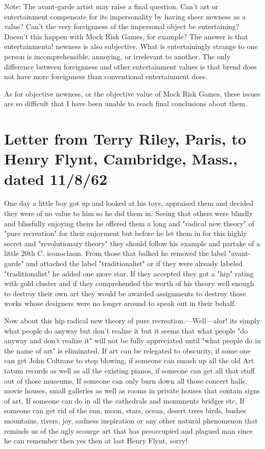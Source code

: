 \documentclass[10pt,twoside]{memoir}
\begin{document}
\begin{enumerate}
{\begin{enumerate}
Note: The avant-garde artist may raise a final question. Can't art or 
entertainment compensate for its impersonality by having sheer newness as a 
value? Can't the very foreignness of the impersonal object be entertaining? 
Doesn't this happen with Mock Risk Games, for example? The answer is 
that entertainmenta! newness is also subjective. What is entertainingly 
strange to one person is incomprehensible, annoying, or irrelevant to 
another. The only difference between foreignness and other entertainment 
values is that brend does not have more foreignness than conventional 
entertainment does. 

As for objective newness, or the objective value of Mock Risk Games, these 
issues are so difficult that I have been unable to reach final conclusions 
about them. 

\clearpage

\section{Letter from Terry Riley, Paris, to Henry Flynt, Cambridge, 
Mass., dated 11/8/62}

One day a little boy got up and looked at his toys, appraised them and 
decided they were of no value to him so he did them in. Seeing that others 
were blindly and blissfully enjoying theirs he offered them a long and 
"radical new theory" of "pure recreation" for their enjoyment but before he 
let them in for this highly secret and "revolutionary theory" they should 
follow his example and partake of a little 20th C. iconoclasm. From those 
that balked he removed the label "avant-garde" and attached the label 
"traditionalist" or if they were already labeled "traditionalist" he added one 
more star. If they accepted they got a "hip" rating with gold cluster and if 
they comprehended the worth of his theory well enough to destroy their 
own art they would be awarded assignments to destroy those works whose 
designers were no longer around to speak out in their behalf. 

Now about this hip radical new theory of pure recreation.---Well---alor! its 
simply what people do anyway but don't realize it but it seems that what 
people "do anyway and don't realize it" will not be fully appreciated until 
"what people do in the name of art" is eliminated. If art can be relegated to 
obscurity, if some one can get John Coltrane to stop blowing, if someone 
can smash up all the old Art tatum records as well as all the existing pianos, 
if someone can get all that stuff out of those museums, If someone can only 
burn down all those concert halls, movie houses, small galleries as well as 
rooms in private houses that contain signs of art, If someone can do in all the 
cathedrals and monuments bridges etc, If someone can get rid of the sun, 
moon, stars, ocean, desert trees birds, bushes mountains, rivers, joy, sadness 
inspiration or any other natural phenomenon that reminds us of the ugly 
scourge art that has preoccupied and plagued man since he can remember 
then yes then at last Henry Flynt, sorry! 


\end{enumerate}}
\end{enumerate}
\end{document}
